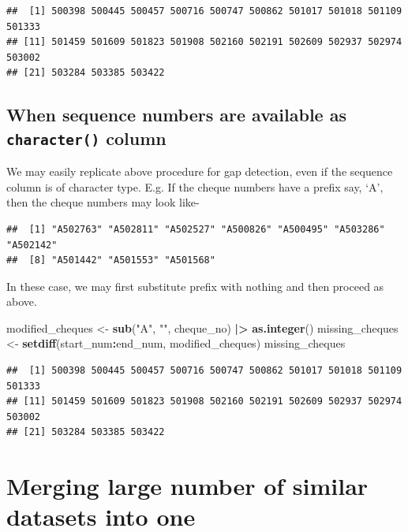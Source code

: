\documentclass[
]{book}
\newenvironment{Shaded}{\begin{snugshade}}{\end{snugshade}}
\newcommand{\FunctionTok}[1]{\textcolor[rgb]{0.13,0.29,0.53}{\textbf{#1}}}
\newcommand{\NormalTok}[1]{#1}
\newcommand{\OtherTok}[1]{\textcolor[rgb]{0.56,0.35,0.01}{#1}}
\newcommand{\SpecialCharTok}[1]{\textcolor[rgb]{0.81,0.36,0.00}{\textbf{#1}}}
\newcommand{\StringTok}[1]{\textcolor[rgb]{0.31,0.60,0.02}{#1}}
\begin{document}
\begin{verbatim}
##  [1] 500398 500445 500457 500716 500747 500862 501017 501018 501109 501333
## [11] 501459 501609 501823 501908 502160 502191 502609 502937 502974 503002
## [21] 503284 503385 503422
\end{verbatim}

\hypertarget{when-sequence-numbers-are-available-as-character-column}{%
\section{\texorpdfstring{When sequence numbers are available as \texttt{character()} column}{When sequence numbers are available as character() column}}\label{when-sequence-numbers-are-available-as-character-column}}

We may easily replicate above procedure for gap detection, even if the sequence column is of character type. E.g. If the cheque numbers have a prefix say, `A', then the cheque numbers may look like-

\begin{verbatim}
##  [1] "A502763" "A502811" "A502527" "A500826" "A500495" "A503286" "A502142"
##  [8] "A501442" "A501553" "A501568"
\end{verbatim}

In these case, we may first substitute prefix with nothing and then proceed as above.

\begin{Shaded}
\begin{Highlighting}[]
\NormalTok{modified\_cheques }\OtherTok{\textless{}{-}} \FunctionTok{sub}\NormalTok{(}\StringTok{"A"}\NormalTok{, }\StringTok{""}\NormalTok{, cheque\_no) }\SpecialCharTok{|\textgreater{}} \FunctionTok{as.integer}\NormalTok{()}
\NormalTok{missing\_cheques }\OtherTok{\textless{}{-}} \FunctionTok{setdiff}\NormalTok{(start\_num}\SpecialCharTok{:}\NormalTok{end\_num, modified\_cheques)}
\NormalTok{missing\_cheques}
\end{Highlighting}
\end{Shaded}

\begin{verbatim}
##  [1] 500398 500445 500457 500716 500747 500862 501017 501018 501109 501333
## [11] 501459 501609 501823 501908 502160 502191 502609 502937 502974 503002
## [21] 503284 503385 503422
\end{verbatim}

\hypertarget{merging-large-number-of-similar-datasets-into-one}{%
\chapter{Merging large number of similar datasets into one}\label{merging-large-number-of-similar-datasets-into-one}}
\end{document}
